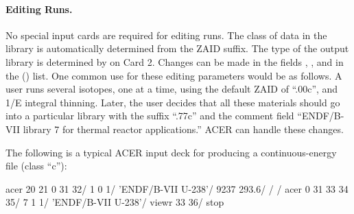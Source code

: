 \paragraph{Editing Runs.}
No special input cards are required for editing runs.  The class of data
in the library is automatically determined from the ZAID suffix.  The
type of the output library is determined by  on Card 2.
Changes can be made in the fields , , and in the
() list.  One common use for these editing parameters would
be as follows.  A user runs several isotopes, one at a time, using the
default ZAID of ``.00c'', and 1/E integral thinning.  Later, the user
decides that all these materials  should go into a particular library
with the suffix ``.77c'' and the comment field ``ENDF/B-VII library 7
for thermal reactor applications.'' ACER can handle these changes.

The following is a typical ACER input deck for producing a
continuous-energy file (class ``c''):

\small
\begin{ccode}

      acer
      20 21 0 31 32/
      1 0 1/
      'ENDF/B-VII U-238'/
      9237 293.6/
      /
      /
      acer
      0 31 33 34 35/
      7 1 1/
      'ENDF/B-VII U-238'/
      viewr
      33 36/
      stop

\end{ccode}
\normalsize

